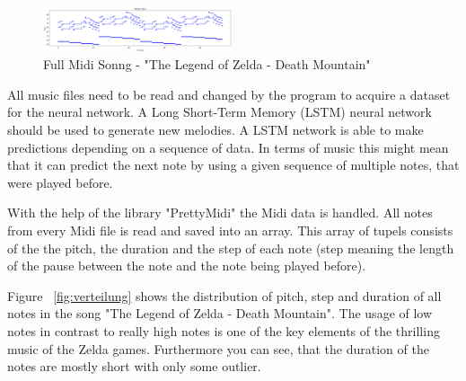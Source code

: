 \begin{figure}
\centering
\includegraphics[width=0.5\textwidth]{./pics/fullSong.PNG}
\caption{Full Midi Sonng - "The Legend of Zelda - Death Mountain"}
\label{fig:fullSong}    
\end{figure}

All music files need to be read and changed by the program to acquire
a dataset for the neural network. A Long Short-Term Memory (LSTM) neural
network should be used to generate new melodies. A LSTM network is able to 
make predictions depending on a sequence of data. In terms of music this 
might mean that it can predict the next note by using a given sequence of 
multiple notes, that were played before.

With the help of the library "PrettyMidi" the Midi data is handled. All notes
from every Midi file is read and saved into an array. This array of tupels 
consists of the the pitch, the duration and the step of each note (step meaning
the length of the pause between the note and the note being played before).

Figure ~\ref{fig:verteilung} shows the distribution of pitch, step and duration
of all notes in the song "The Legend of Zelda - Death Mountain". The usage of 
low notes in contrast to really high notes is one of the key elements of 
the thrilling music of the Zelda games. Furthermore you can see, that the duration of
the notes are mostly short with only some outlier. 

